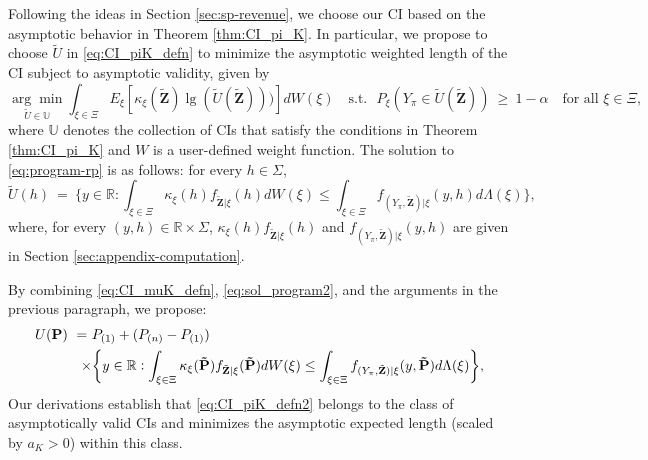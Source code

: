Following the ideas in Section \ref{sec:sp-revenue}, we choose our CI based on the asymptotic behavior in Theorem \ref{thm:CI_pi_K}. In particular, we propose to choose $\tilde{U}$ in \eqref{eq:CI_piK_defn} to minimize the asymptotic weighted length of the CI subject to asymptotic validity, given by
\begin{equation}
\underset{\tilde{U} \in \mathbb{U}}{\arg\min} \int_{\xi \in \Xi} E_{\xi }[ \kappa _{\xi }(\tilde{\mathbf{{Z}}})\lg (\tilde{U}(\tilde{\mathbf{{Z}}})))] dW(\xi )~~~\text{ s.t.}~~~
P_{\xi }( Y_{\pi }\in \tilde{ U}(\mathbf{\tilde{Z}})) ~\geq~ 1-\alpha~~~\text{ for all }\xi \in \Xi ,
\label{eq:program-rp}
\end{equation}
where $\mathbb{U}$ denotes the collection of CIs that satisfy the conditions in Theorem \ref{thm:CI_pi_K} and $W$ is a user-defined weight function. 
The solution to \eqref{eq:program-rp} is as follows: for every $h \in \Sigma$,
\begin{equation}
\tilde{U}(h) ~=~ \bigg\{ y \in \mathbb{R} : \int_{\xi \in \Xi} \kappa_{\xi}(h)f_{\tilde{\mathbf{Z}}|\xi}(h) dW(\xi) \leq \int_{\xi \in \Xi} f_{(Y_{\pi},\tilde{\mathbf{Z}})|\xi}(y,h) d\Lambda(\xi) \bigg\}, \label{eq:Lambda-rp}
\end{equation}
where, for every $(y,h) \in \mathbb{R} \times \Sigma$, $\kappa_{\xi}(h)f_{\tilde{\mathbf{Z}}|\xi}(h)$ and $f_{(Y_{\pi},\tilde{\mathbf{Z}})|\xi}(y,h)$ are given in Section \ref{sec:appendix-computation}.

By combining \eqref{eq:CI_muK_defn}, \eqref{eq:sol_program2}, and the arguments in the previous paragraph, we propose:
\begin{align}
U(\mathbf{P})~=~& P_{(1)}+( P_{(n)}-P_{(1)}) \notag \\ 
\times& \bigg\{ y \in \mathbb{R} : \int_{\xi \in \Xi} \kappa_{\xi}(\mathbf{\tilde{P}}) f_{\tilde{\mathbf{Z}}|\xi}(\mathbf{\tilde{P}}) dW(\xi) \leq \int_{\xi \in \Xi} f_{(Y_{\pi},\tilde{\mathbf{Z}})|\xi}(y,\mathbf{\tilde{P}}) d\Lambda(\xi) \bigg\} , \label{eq:CI_piK_defn2}
\end{align}
Our derivations establish that \eqref{eq:CI_piK_defn2} belongs to the class of asymptotically valid CIs and minimizes the asymptotic expected length (scaled by $a_K>0$) within this class.


